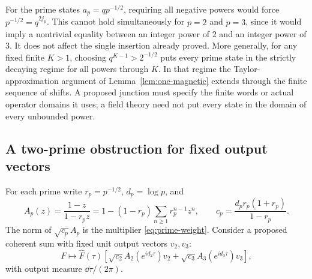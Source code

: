 For the prime states $a_p=qp^{-1/2}$, requiring all negative powers
would force $p^{-1/2}=q^{2j_p}$. This cannot hold simultaneously for
$p=2$ and $p=3$, since it would imply a nontrivial equality between
an integer power of $2$ and an integer power of $3$. It does not affect
the single insertion already proved. More generally, for any fixed
finite $K>1$, choosing $q^{K-1}>2^{-1/2}$ puts every prime state in
the strictly decaying regime for all powers through $K$. In that
regime the Taylor-approximation argument of
Lemma~\ref{lem:one-magnetic} extends through the finite sequence of
shifts. A proposed junction must specify the finite words or actual
operator domains it uses; a field theory need not put every state in
the domain of every unbounded power.

\subsection{A two-prime obstruction for fixed output vectors}
For each prime write $r_p=p^{-1/2}$, $d_p=\log p$, and
\begin{equation}\label{eq:prime-filter}
 A_p(z)=\frac{1-z}{1-r_pz}
 =1-(1-r_p)\sum_{n\geq1}r_p^{n-1}z^n,
 \qquad c_p=\frac{d_pr_p(1+r_p)}{1-r_p}.
\end{equation}
The norm of $\sqrt{c_p}A_p$ is the multiplier
\eqref{eq:prime-weight}. Consider a proposed coherent sum with fixed
unit output vectors $v_2,v_3$:
\begin{equation}\label{eq:constant-vector-source}
 F\longmapsto\widehat F(\tau)
 \left[\sqrt{c_2}A_2(e^{id_2\tau})v_2
       +\sqrt{c_3}A_3(e^{id_3\tau})v_3\right],
\end{equation}
with output measure $\dd\tau/(2\pi)$.

